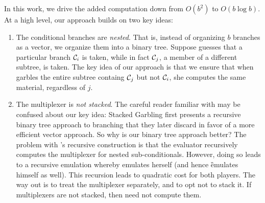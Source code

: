 In this work, we drive the added computation down from $O(b^2)$ to
$O(b \log b)$.
At a high level, our approach builds on two key ideas:
\begin{enumerate}
  \item The conditional branches are \emph{nested}.
    That is, instead of organizing $b$ branches as a vector, we
    organize them into a binary tree.
    Suppose \E guesses that a particular branch $\mathcal{C}_i$ is taken,
    while in fact $\mathcal{C}_j$, a member of a different subtree, is taken.
    The key idea of our approach is that we ensure that when \ev
    garbles the entire subtree containg $\mathcal{C}_j$ but not $\mathcal{C}_i$, she
    computes the same material, regardless of $j$.
  \item The multiplexer is \emph{not stacked}.
    The careful reader familiar with \cite{EPRINT:HeaKol20b} may be
    confused about our key idea: Stacked Garbling first presents a
    recursive binary tree approach to branching that they later
    discard in favor of a more efficient vector approach.
    So why is our binary tree approach better?
    The problem with \cite{EPRINT:HeaKol20b}'s recursive construction
    is that the evaluator recursively computes the multiplexer for
    nested sub-conditionals.
    However, doing so leads to a recursive emulation whereby \E
    emulates herself (and hence \G emulates himself as well).
    This recursion leads to quadratic cost for both players.
    The way out is to treat the multiplexer separately, and to opt not
    to stack it.
    If multiplexers are not stacked, then \E need not compute them.
\end{enumerate}


